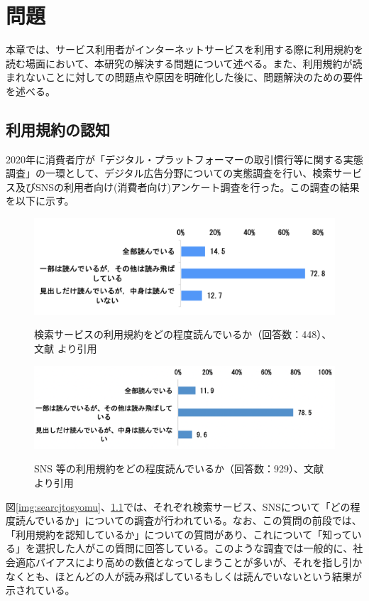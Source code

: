 \chapter{問題}
\label{issue}

本章では、サービス利用者がインターネットサービスを利用する際に利用規約を読む場面において、本研究の解決する問題について述べる。また、利用規約が読まれないことに対しての問題点や原因を明確化した後に、問題解決のための要件を述べる。

\section{利用規約の認知}
2020年に消費者庁が「デジタル・プラットフォーマーの取引慣行等に関する実態調査」の一環として、デジタル広告分野についての実態調査を行い、検索サービス及びSNSの利用者向け(消費者向け)アンケート調査を行った。この調査の結果を以下に示す。
\begin{figure}[h]
  \begin{center}
      \includegraphics[width=13cm]{img/searchtosyomu.png}
      \caption{検索サービスの利用規約をどの程度読んでいるか（回答数：448）、文献\cite{jftc2021} より引用}
      \label{img:searcjtosyomu}
      \includegraphics[width=13cm]{img/snstosyomu.png}
      \caption{SNS 等の利用規約をどの程度読んでいるか（回答数：929）、文献\cite{jftc2021} より引用}
      \label{img:snstosyomu}
  \end{center}
\end{figure}

図\ref{img:searcjtosyomu}、\ref{img:snstosyomu}では、それぞれ検索サービス、SNSについて「どの程度読んでいるか」についての調査が行われている。なお、この質問の前段では、「利用規約を認知しているか」についての質問があり、これについて「知っている」を選択した人がこの質問に回答している。このような調査では一般的に、社会適応バイアスにより高めの数値となってしまうことが多いが、それを指し引かなくとも、ほとんどの人が読み飛ばしているもしくは読んでいないという結果が示されている。

